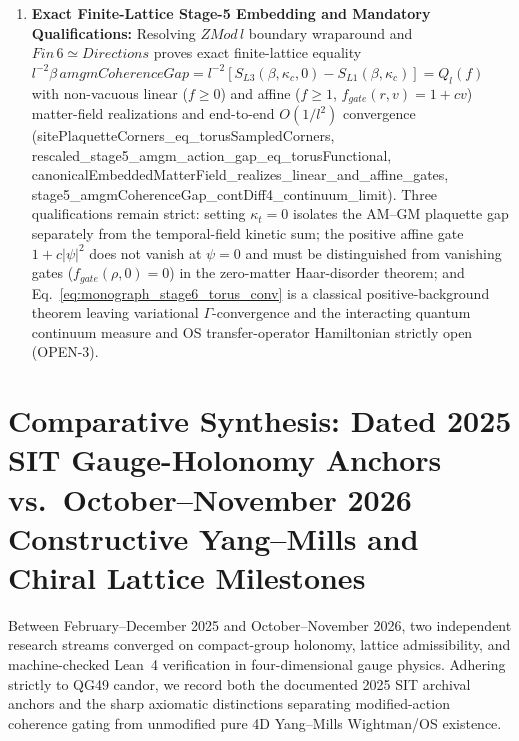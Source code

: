 \documentclass[american,11pt,letterpaper]{article}
\def\mathrm#1{#1}%
\def\texttt#1{#1}%
\def\emph#1{#1}%
\begin{document}
\begin{enumerate}[leftmargin=2em]
  \item \textbf{Exact Finite-Lattice Stage-5 Embedding and Mandatory Qualifications:} Resolving $\mathrm{ZMod}\,l$ boundary wraparound and $\mathrm{Fin}\,6 \simeq \mathrm{Directions}$ proves exact finite-lattice equality $l^{-2}\beta\,\mathrm{amgmCoherenceGap} = l^{-2}[S_{\mathrm{L3}}(\beta,\kappa_c,0) - S_{\mathrm{L1}}(\beta,\kappa_c)] = Q_l(f)$ with non-vacuous linear ($f \ge 0$) and affine ($f \ge 1$, $f_{\mathrm{gate}}(r,v) = 1 + c v$) matter-field realizations and end-to-end $O(1/l^2)$ convergence (\texttt{sitePlaquetteCorners\_\allowbreak{}eq\_\allowbreak{}torusSampledCorners}, \texttt{rescaled\_\allowbreak{}stage5\_\allowbreak{}amgm\_\allowbreak{}action\_\allowbreak{}gap\_\allowbreak{}eq\_\allowbreak{}torusFunctional}, \texttt{canonicalEmbeddedMatterField\_\allowbreak{}realizes\_\allowbreak{}linear\_\allowbreak{}and\_\allowbreak{}affine\_\allowbreak{}gates}, \texttt{stage5\_\allowbreak{}amgmCoherenceGap\_\allowbreak{}contDiff4\_\allowbreak{}continuum\_\allowbreak{}limit}). Three qualifications remain strict: setting $\kappa_t = 0$ isolates the AM--GM plaquette gap separately from the temporal-field kinetic sum; the positive affine gate $1 + c|\psi|^2$ does not vanish at $\psi = 0$ and must be distinguished from vanishing gates ($f_{\mathrm{gate}}(\rho,0) = 0$) in the zero-matter Haar-disorder theorem; and Eq.~\eqref{eq:monograph_stage6_torus_conv} is a \emph{classical} positive-background theorem leaving variational $\Gamma$-convergence and the interacting \emph{quantum} continuum measure and OS transfer-operator Hamiltonian strictly open (\texttt{OPEN-3}).
\end{enumerate}

\section{Comparative Synthesis: Dated 2025 SIT Gauge-Holonomy Anchors vs.\ October--November 2026 Constructive Yang--Mills and Chiral Lattice Milestones}
\label{sec:2025-vs-2026-ym}

Between February--December 2025 and October--November 2026, two independent research streams converged on compact-group holonomy, lattice admissibility, and machine-checked Lean~4 verification in four-dimensional gauge physics. Adhering strictly to \texttt{QG49} candor, we record both the documented 2025 SIT archival anchors and the sharp axiomatic distinctions separating modified-action coherence gating from unmodified pure 4D Yang--Mills Wightman/OS existence.
\end{document}
